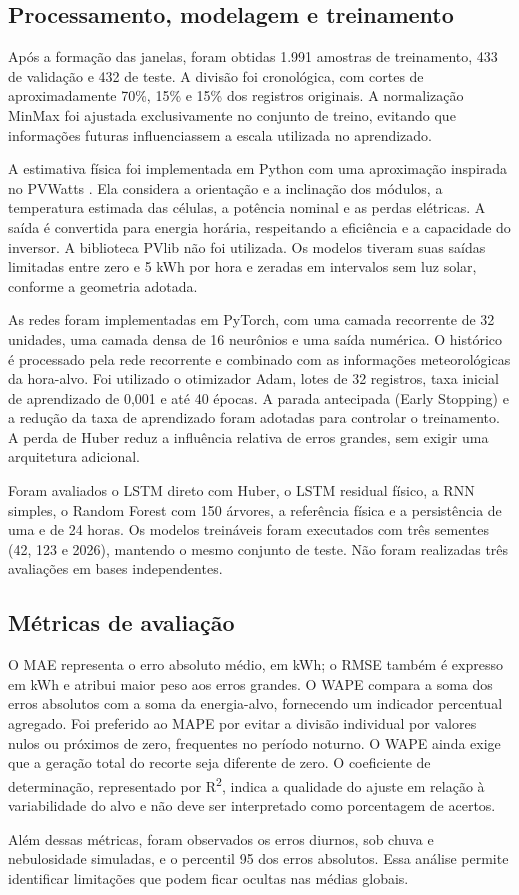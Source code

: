 \subsection{Processamento, modelagem e treinamento}
Após a formação das janelas, foram obtidas 1.991 amostras de treinamento, 433 de validação e 432 de teste. A divisão foi cronológica, com cortes de aproximadamente 70\%, 15\% e 15\% dos registros originais. A normalização MinMax foi ajustada exclusivamente no conjunto de treino, evitando que informações futuras influenciassem a escala utilizada no aprendizado.

A estimativa física foi implementada em Python com uma aproximação inspirada no PVWatts \cite{pvwatts}. Ela considera a orientação e a inclinação dos módulos, a temperatura estimada das células, a potência nominal e as perdas elétricas. A saída é convertida para energia horária, respeitando a eficiência e a capacidade do inversor. A biblioteca PVlib não foi utilizada. Os modelos tiveram suas saídas limitadas entre zero e 5 kWh por hora e zeradas em intervalos sem luz solar, conforme a geometria adotada.

As redes foram implementadas em PyTorch, com uma camada recorrente de 32 unidades, uma camada densa de 16 neurônios e uma saída numérica. O histórico é processado pela rede recorrente e combinado com as informações meteorológicas da hora-alvo. Foi utilizado o otimizador Adam, lotes de 32 registros, taxa inicial de aprendizado de 0,001 e até 40 épocas. A parada antecipada (Early Stopping) e a redução da taxa de aprendizado foram adotadas para controlar o treinamento. A perda de Huber \cite{huber} reduz a influência relativa de erros grandes, sem exigir uma arquitetura adicional.

Foram avaliados o LSTM direto com Huber, o LSTM residual físico, a RNN simples, o Random Forest com 150 árvores, a referência física e a persistência de uma e de 24 horas. Os modelos treináveis foram executados com três sementes (42, 123 e 2026), mantendo o mesmo conjunto de teste. Não foram realizadas três avaliações em bases independentes.

\subsection{Métricas de avaliação}
O MAE representa o erro absoluto médio, em kWh; o RMSE também é expresso em kWh e atribui maior peso aos erros grandes. O WAPE compara a soma dos erros absolutos com a soma da energia-alvo, fornecendo um indicador percentual agregado. Foi preferido ao MAPE por evitar a divisão individual por valores nulos ou próximos de zero, frequentes no período noturno. O WAPE ainda exige que a geração total do recorte seja diferente de zero. O coeficiente de determinação, representado por R\textsuperscript{2}, indica a qualidade do ajuste em relação à variabilidade do alvo e não deve ser interpretado como porcentagem de acertos.

Além dessas métricas, foram observados os erros diurnos, sob chuva e nebulosidade simuladas, e o percentil 95 dos erros absolutos. Essa análise permite identificar limitações que podem ficar ocultas nas médias globais.
\FloatBarrier